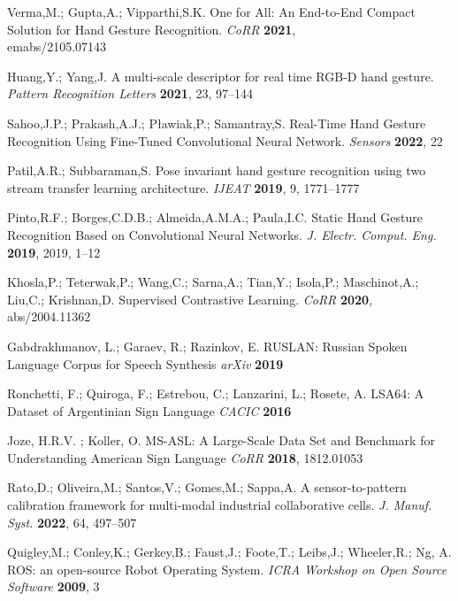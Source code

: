 \begin{thebibliography}{999}
Verma,M.; Gupta,A.; Vipparthi,S.K. One for All: An End-to-End Compact Solution for Hand Gesture Recognition. {\em CoRR} {\bf 2021}, {\\emabs/2105.07143}

Huang,Y.; Yang,J. A multi-scale descriptor for real time RGB-D hand gesture. {\em Pattern Recognition Letters} {\bf 2021}, {23}, 97--144

Sahoo,J.P.; Prakash,A.J.; Pławiak,P.; Samantray,S. Real-Time Hand Gesture Recognition Using Fine-Tuned Convolutional Neural Network. {\em Sensors} {\bf 2022}, {22}

Patil,A.R.; Subbaraman,S. Pose invariant hand gesture recognition using two stream transfer learning architecture. {\em IJEAT} {\bf 2019}, {9}, 1771--1777

Pinto,R.F.; Borges,C.D.B.; Almeida,A.M.A.; Paula,I.C. Static Hand Gesture Recognition Based on Convolutional Neural Networks. {\em J. Electr. Comput. Eng.} {\bf 2019}, {2019}, 1--12

Khosla,P.; Teterwak,P.; Wang,C.; Sarna,A.; Tian,Y.; Isola,P.; Maschinot,A.; Liu,C.; Krishnan,D. Supervised Contrastive Learning. {\em CoRR} {\bf 2020}, {abs/2004.11362}

Gabdrakhmanov, L.; Garaev, R.; Razinkov, E. RUSLAN: Russian Spoken Language Corpus for Speech Synthesis {\em arXiv} {\bf 2019}

Ronchetti, F.; Quiroga, F.; Estrebou, C.; Lanzarini, L.; Rosete, A. LSA64: A Dataset of Argentinian Sign Language {\em CACIC} {\bf 2016}

Joze, H.R.V. ; Koller, O. MS-ASL: A Large-Scale Data Set and Benchmark for Understanding American Sign Language {\em CoRR} {\bf 2018}, {1812.01053}

Rato,D.; Oliveira,M.; Santos,V.; Gomes,M.; Sappa,A. A sensor-to-pattern calibration framework for multi-modal industrial collaborative cells. {\em J. Manuf. Syst.} {\bf 2022}, {64}, 497--507

Quigley,M.; Conley,K.; Gerkey,B.; Faust,J.; Foote,T.; Leibs,J.; Wheeler,R.; Ng, A. ROS: an open-source Robot Operating System. {\em ICRA Workshop on Open Source Software} {\bf 2009}, {3}


\end{thebibliography}
